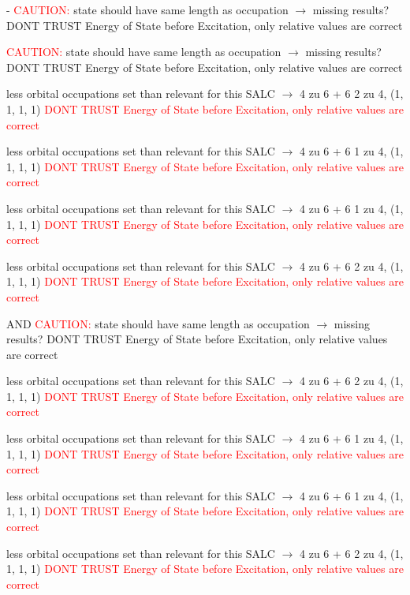 \documentclass[12pt,a4paper]{article}
\begin{document}
 - 	\textcolor{red}{CAUTION:} state should have same length as occupation $\rightarrow$ missing results?
	DONT TRUST \glqq{}Energy of State before Excitation\grqq{}, only relative values are correct

	\textcolor{red}{CAUTION:} state should have same length as occupation $\rightarrow$ missing results?
	DONT TRUST \glqq{}Energy of State before Excitation\grqq{}, only relative values are correct

less orbital occupations set than relevant for this SALC $\rightarrow$ 
4 zu 6 + 6 
2 zu 4, (1, 1, 1, 1) 
\textcolor{red}{DONT TRUST \glqq{}Energy of State before Excitation\grqq{}, only relative values are correct}

less orbital occupations set than relevant for this SALC $\rightarrow$ 
4 zu 6 + 6 
1 zu 4, (1, 1, 1, 1) 
\textcolor{red}{DONT TRUST \glqq{}Energy of State before Excitation\grqq{}, only relative values are correct}

less orbital occupations set than relevant for this SALC $\rightarrow$ 
4 zu 6 + 6 
1 zu 4, (1, 1, 1, 1) 
\textcolor{red}{DONT TRUST \glqq{}Energy of State before Excitation\grqq{}, only relative values are correct}

less orbital occupations set than relevant for this SALC $\rightarrow$ 
4 zu 6 + 6 
2 zu 4, (1, 1, 1, 1) 
\textcolor{red}{DONT TRUST \glqq{}Energy of State before Excitation\grqq{}, only relative values are correct}

 AND 	\textcolor{red}{CAUTION:} state should have same length as occupation $\rightarrow$ missing results?
	DONT TRUST \glqq{}Energy of State before Excitation\grqq{}, only relative values are correct

less orbital occupations set than relevant for this SALC $\rightarrow$ 
4 zu 6 + 6 
2 zu 4, (1, 1, 1, 1) 
\textcolor{red}{DONT TRUST \glqq{}Energy of State before Excitation\grqq{}, only relative values are correct}

less orbital occupations set than relevant for this SALC $\rightarrow$ 
4 zu 6 + 6 
1 zu 4, (1, 1, 1, 1) 
\textcolor{red}{DONT TRUST \glqq{}Energy of State before Excitation\grqq{}, only relative values are correct}

less orbital occupations set than relevant for this SALC $\rightarrow$ 
4 zu 6 + 6 
1 zu 4, (1, 1, 1, 1) 
\textcolor{red}{DONT TRUST \glqq{}Energy of State before Excitation\grqq{}, only relative values are correct}

less orbital occupations set than relevant for this SALC $\rightarrow$ 
4 zu 6 + 6 
2 zu 4, (1, 1, 1, 1) 
\textcolor{red}{DONT TRUST \glqq{}Energy of State before Excitation\grqq{}, only relative values are correct}
\end{document}
